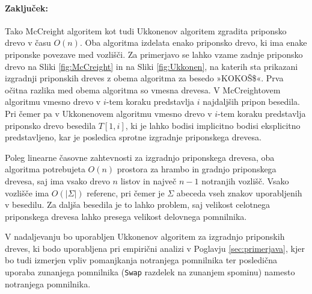 \paragraph{Zaključek:}
Tako McCreight algoritem \cite{McCreight1976} kot tudi  Ukkonenov algoritem \cite{Ukkonen1995} zgradita priponsko drevo v času $O(n)$. Oba algoritma izdelata enako priponsko drevo, ki ima enake priponske povezave med vozlišči. Za primerjavo se lahko vzame zadnje priponsko drevo na Sliki \ref{fig:McCreight} in na Sliki \ref{fig:Ukkonen}, na katerih sta prikazani izgradnji priponskih dreves z obema algoritma za besedo »KOKOŠ\$«. Prva očitna razlika med obema algoritma so vmesna drevesa. V McCreightovem algoritmu vmesno drevo v $i$-tem koraku predstavlja $i$ najdaljših pripon besedila. Pri čemer pa v Ukkonenovem algoritmu vmesno drevo v $i$-tem koraku predstavlja priponsko drevo besedila $T[1,i]$, ki je lahko bodisi implicitno bodisi eksplicitno predstavljeno, kar je posledica sprotne izgradnje priponskega drevesa.

Poleg linearne časovne zahtevnosti za izgradnjo priponskega drevesa, oba algoritma potrebujeta $O(n)$ prostora za hrambo in gradnjo priponskega drevesa, saj ima vsako drevo $n$ listov in največ $n-1$ notranjih vozlišč. Vsako vozlišče ima $O(|\Sigma|)$ referenc, pri čemer je $\Sigma$ abeceda vseh znakov uporabljenih v besedilu. Za daljša besedila je to lahko problem, saj velikost celotnega priponskega drevesa lahko presega velikost delovnega pomnilnika.

V nadaljevanju bo uporabljen Ukkonenov algoritem za izgradnjo priponskih dreves, ki bodo uporabljena pri empirični analizi v Poglavju \ref{sec:primerjava}, kjer bo tudi izmerjen vpliv pomanjkanja notranjega pomnilnika ter posledična uporaba zunanjega pomnilnika (\verb|Swap| razdelek na zunanjem spominu) namesto notranjega pomnilnika.
